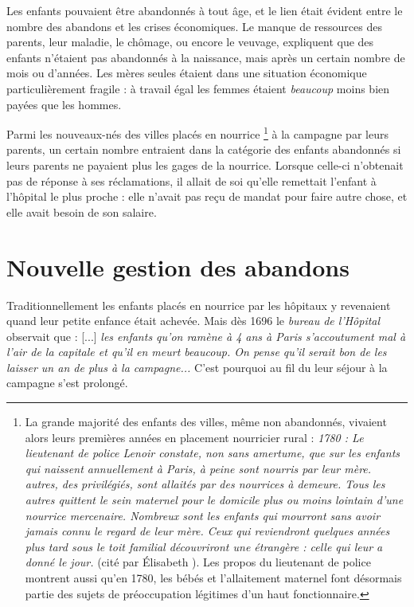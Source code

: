  Les enfants pouvaient être abandonnés à tout âge, et le lien était évident entre le nombre des abandons et les crises économiques. Le manque de ressources des parents, leur maladie, le chômage, ou encore le veuvage, expliquent que des enfants n'étaient pas abandonnés à la naissance, mais après un certain nombre de mois ou d'années. Les mères seules étaient dans une situation économique particulièrement fragile : à travail égal les femmes étaient \emph{beaucoup} moins bien payées que les hommes. 

 Parmi les nouveaux-nés des villes placés en nourrice 
\footnote{La grande majorité des enfants des villes, même non abandonnés, vivaient alors leurs premières années en placement nourricier rural : \emph{1780 : Le lieutenant de police Lenoir constate, non sans amertume, que sur les  enfants qui naissent annuellement à Paris,  à peine sont nourris par leur mère.  autres, des privilégiés, sont allaités par des nourrices à demeure. Tous les autres quittent le sein maternel pour le domicile plus ou moins lointain d'une nourrice mercenaire. Nombreux sont les enfants qui mourront sans avoir jamais connu le regard de leur mère. Ceux qui reviendront quelques années plus tard sous le toit familial découvriront une étrangère : celle qui leur a donné le jour.} (cité par Élisabeth ). Les propos du lieutenant de police montrent aussi qu'en 1780, les bébés et l'allaitement maternel font désormais partie des sujets de préoccupation légitimes d'un haut fonctionnaire.} 
à la campagne par leurs parents, un certain nombre entraient dans la catégorie des enfants abandonnés si leurs parents ne payaient plus les gages de la nourrice. Lorsque celle-ci n'obtenait pas de réponse à ses réclamations, il allait de soi qu'elle remettait l'enfant à l'hôpital le plus proche : elle n'avait pas reçu de mandat pour faire autre chose, et elle avait besoin de son salaire. 

 
 \section{Nouvelle gestion des abandons}


 Traditionnellement les enfants placés en nourrice par les hôpitaux y revenaient quand leur petite enfance était achevée. Mais dès 1696 le \emph{bureau de l'Hôpital} observait que : [...] \emph{les enfants qu'on ramène à 4 ans à Paris s'accoutument mal à l'air de la capitale et qu'il en meurt beaucoup. On pense qu'il serait bon de les laisser un an de plus à la campagne...} C'est pourquoi au fil du  leur séjour à la campagne s'est prolongé.


